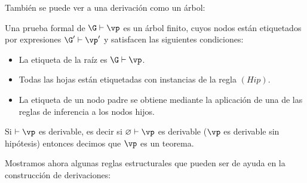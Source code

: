 \documentclass[11pt,letterpaper]{article}
\begin{document}
\bigskip


\newpage

\noindent Tambi\'en se puede ver a una derivaci\'on como un \'arbol:
\begin{definition}
  Una prueba formal de $\G\vdash\vp$ es un árbol finito, cuyos nodos están
  etiquetados por expresiones $\G'\vdash\vp'$ y satisfacen las siguientes
  condiciones:
  \begin{itemize}
  \item La etiqueta de la raíz es $\G\vdash\vp$.
  \item Todas las hojas están etiquetadas con instancias de la regla $(Hip)$.
  \item La etiqueta de un nodo padre se obtiene mediante la aplicación de una
  de las reglas de inferencia a los nodos hijos.
  \end{itemize}
\end{definition}

\begin{definition}
  Si $\vdash\vp$ es derivable, es decir si $\varnothing\vdash\vp$ es
  derivable ($\vp$ es derivable sin hipótesis) entonces decimos que $\vp$ es 
  un teorema.
\end{definition}

Mostramos ahora algunas reglas estructurales que pueden ser de ayuda en la 
construcción de derivaciones:

\end{document}
